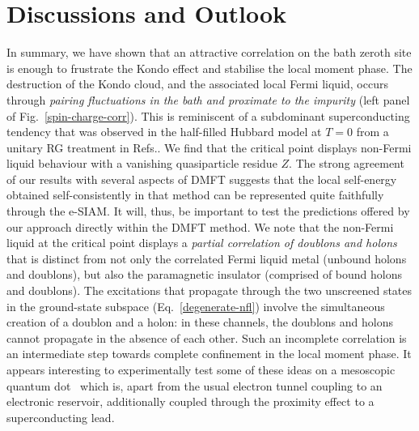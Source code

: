 \documentclass{iopart}
\begin{document}
\section{Discussions and Outlook}
\label{concl}
In summary, we have shown that an attractive correlation on the bath zeroth site is enough to frustrate the Kondo effect and stabilise the local moment phase. 
The destruction of the Kondo cloud, and the associated local Fermi liquid, occurs through {\it pairing fluctuations in the bath and proximate to the impurity} (left panel of Fig.~\eqref{spin-charge-corr}).
This is reminiscent of a subdominant superconducting tendency that was observed in the half-filled Hubbard model at $T=0$ from a unitary RG treatment in Refs.\cite{anirbanmott1,Mukherjee_mott_merg}.
We find that the critical point displays non-Fermi liquid behaviour with a vanishing quasiparticle residue \(Z\). 
The strong agreement of our results with several aspects of DMFT suggests that the local self-energy obtained self-consistently in that method can be represented quite faithfully through the e-SIAM. It will, thus, be important to test the predictions offered by our approach directly within the DMFT method. We note that the non-Fermi liquid at the critical point displays a {\it partial correlation of doublons and holons} that is distinct from not only the correlated Fermi liquid metal (unbound holons and doublons), but also the paramagnetic insulator (comprised of bound holons and doublons). The excitations that propagate through the two unscreened states in the ground-state subspace (Eq.~\eqref{degenerate-nfl}) involve the simultaneous creation of a doublon and a holon: in these channels, the doublons and holons cannot propagate in the absence of each other. Such an incomplete correlation is an intermediate step towards complete confinement in the local moment phase. It appears interesting to experimentally test some of these ideas on a mesoscopic quantum dot~\cite{Iftikhar2015,Iftikhar2018} which is, apart from the usual electron tunnel coupling to an electronic reservoir, additionally coupled through the proximity effect to a superconducting lead.
\end{document}
